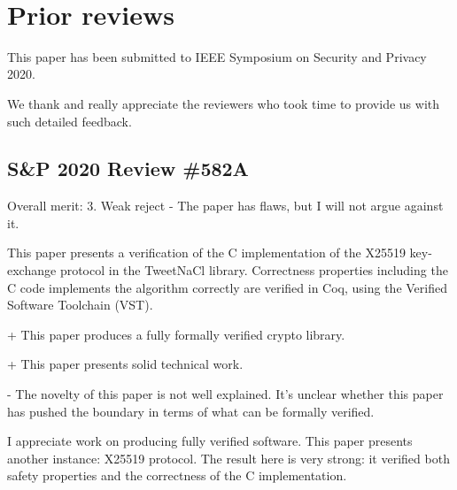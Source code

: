 \newpage
~\\
\newpage

\section{Prior reviews}
\label{appendix:past-reviews}

This paper has been submitted to IEEE Symposium on Security and Privacy 2020.

We thank and really appreciate the reviewers who took time to provide us with
such detailed feedback.

\subsection{S\&P 2020 Review \#582A}

Overall merit: 3. Weak reject - The paper has flaws, but I will
not argue against it.

\begin{center}
\end{center}

This paper presents a verification of the C implementation
of the X25519 key-exchange protocol in the TweetNaCl
library. Correctness properties including the C code implements
the algorithm correctly are verified in Coq, using the
Verified Software Toolchain (VST).


\begin{center}
\end{center}

+ This paper produces a fully formally verified crypto library.

+ This paper presents solid technical work.


\begin{center}
\end{center}

- The novelty of this paper is not well explained. It’s unclear
whether this paper has pushed the boundary in terms of what
can be formally verified.


\begin{center}
\end{center}

I appreciate work on producing fully verified software. This
paper presents another instance: X25519 protocol. The result
here is very strong: it verified both safety properties and the
correctness of the C implementation.

